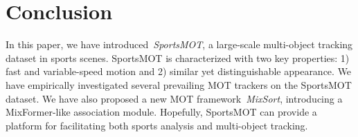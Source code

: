 \documentclass[10pt,twocolumn,letterpaper]{article}
\begin{document}
\begin{table}[pt]
\vspace{-3mm}
\caption{Comparison of ByteTrack, ByteTrack with ReID model and MixSort-Byte on SportsMOT test set. The ReID model is the same as in DeepSORT~\cite{bewley2016simple} and finetuned on SportsMOT. The models are trained on SportsMOT training set and the best results are shown in \textbf{bold}.}
\vspace{-4mm}
\label{tab:sup1}
\end{table}






\section{Conclusion}
In this paper, we have introduced~\emph{SportsMOT}, a large-scale multi-object tracking dataset in sports scenes.
SportsMOT is characterized with two key properties: 1) fast and variable-speed motion and 2) similar yet distinguishable appearance. 
We have empirically investigated several prevailing MOT trackers on the SportsMOT dataset.
We have also proposed a new MOT framework~\emph{MixSort}, introducing a MixFormer-like association module. 
Hopefully, SportsMOT can provide a platform for facilitating both sports analysis and multi-object tracking.




{\small


}
\end{document}
